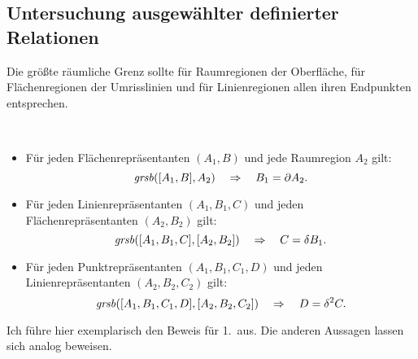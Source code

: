 \subsection{Untersuchung ausgewählter definierter Relationen}



    Die größte räumliche Grenz sollte für Raumregionen der Oberfläche, für Flächenregionen der Umrisslinien und für Linienregionen allen ihren Endpunkten entsprechen.
    \begin{satz}[$\Ggrsb$]\ \vspace{0pt} 

        \begin{itemize}
            \item Für jeden Flächenrepräsentanten $(A_1,B)$ und jede Raumregion $A_2$ gilt:
                $$\mathit{gr\hspace*{-0.25ex}sb}([A_1,B],A_2) \quad \Rightarrow \quad B_1 = \partial A_2.$$
            \item Für jeden Linienrepräsentanten $(A_1,B_1,C)$ und jeden Flächenrepräsentanten $(A_2,B_2)$ gilt:
                $$\mathit{gr\hspace*{-0.25ex}sb}([A_1,B_1,C],[A_2,B_2]) \quad \Rightarrow \quad C = \delta B_1.$$
            \item Für jeden Punktrepräsentanten $(A_1,B_1,C_1,D)$ und jeden Linienrepräsentanten $(A_2,B_2,C_2)$ gilt:
                $$\mathit{gr\hspace*{-0.25ex}sb}([A_1,B_1,C_1,D],[A_2,B_2,C_2]) \quad \Rightarrow \quad D = \delta^2 C.$$
        \end{itemize}

    \end{satz}
    Ich führe hier exemplarisch den Beweis für 1.\ aus. 
    Die anderen Aussagen lassen sich analog beweisen.
